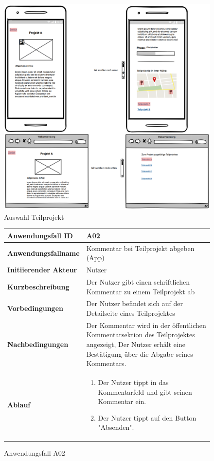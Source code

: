 \begin{figure}[h]
	\centering
	\includegraphics[width=\textwidth]{img/MUhaupt.png}			
	\caption{Auswahl Teilprojekt}
	\label{fig:anwendungsfalldiagramm-app}
\end{figure}


\begin{figure}[h]
	\centering
	\begin{tabularx}{\textwidth}{ X | X }
		\textbf{Anwendungsfall ID} & A02 \\ \hline
		\textbf{Anwendungsfallname} & Kommentar bei Teilprojekt abgeben (App) \\ \hline
		\textbf{Initiierender Akteur} & Nutzer \\ \hline
		\textbf{Kurzbeschreibung} & Der Nutzer gibt einen schriftlichen Kommentar zu einem Teilprojekt ab  \\ \hline
		\textbf{Vorbedingungen} & Der Nutzer befindet sich auf der Detailseite eines Teilprojektes  \\ \hline
		\textbf{Nachbedingungen} & Der Kommentar wird in der öffentlichen Kommentarsektion des Teilprojektes angezeigt, Der Nutzer erhält eine Bestätigung über die Abgabe seines Kommentars.  \\ \hline
		\textbf{Ablauf} &
			\begin{enumerate}
				\item Der Nutzer tippt in das Kommentarfeld und gibt seinen Kommentar ein.
				\item Der Nutzer tippt auf den Button "Absenden".
			\end{enumerate} \\ \hline
		
	\end{tabularx}
	\caption{Anwendungsfall A02}
	\label{fig:anwendungsfall-app-tabelle-xx-1}
\end{figure}

